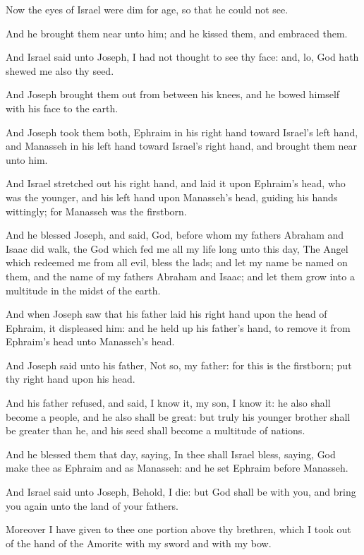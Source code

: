 \Verse Now the eyes of Israel were dim for age, so that he could not see.

And he brought them near unto him; and he kissed them, and embraced them.

\Verse And Israel said unto Joseph, I had not thought to see thy face: and, lo, God hath shewed me also thy seed.

\Verse And Joseph brought them out from between his knees, and he bowed himself with his face to the earth.

\Verse And Joseph took them both, Ephraim in his right hand toward Israel's left hand, and Manasseh in his left hand toward Israel's right hand, and brought them near unto him.

\Verse And Israel stretched out his right hand, and laid it upon Ephraim's head, who was the younger, and his left hand upon Manasseh's head, guiding his hands wittingly; for Manasseh was the firstborn.

\Verse And he blessed Joseph, and said, God, before whom my fathers Abraham and Isaac did walk, the God which fed me all my life long unto this day, \Verse The Angel which redeemed me from all evil, bless the lads; and let my name be named on them, and the name of my fathers Abraham and Isaac; and let them grow into a multitude in the midst of the earth.

\Verse And when Joseph saw that his father laid his right hand upon the head of Ephraim, it displeased him: and he held up his father's hand, to remove it from Ephraim's head unto Manasseh's head.

\Verse And Joseph said unto his father, Not so, my father: for this is the firstborn; put thy right hand upon his head.

\Verse And his father refused, and said, I know it, my son, I know it: he also shall become a people, and he also shall be great: but truly his younger brother shall be greater than he, and his seed shall become a multitude of nations.

\Verse And he blessed them that day, saying, In thee shall Israel bless, saying, God make thee as Ephraim and as Manasseh: and he set Ephraim before Manasseh.

\Verse And Israel said unto Joseph, Behold, I die: but God shall be with you, and bring you again unto the land of your fathers.

\Verse Moreover I have given to thee one portion above thy brethren, which I took out of the hand of the Amorite with my sword and with my bow.

